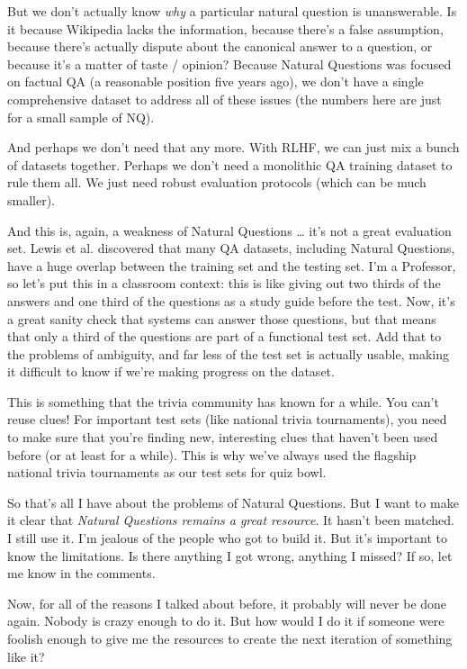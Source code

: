 But we don’t actually know \emph{why} a particular natural question is unanswerable.  Is it because Wikipedia lacks the information, because there’s a false assumption, because there’s actually dispute about the canonical answer to a question, or because it’s a matter of taste / opinion?  Because Natural Questions was focused on factual QA (a reasonable position five years ago), we don’t have a single comprehensive dataset to address all of these issues (the numbers here are just for a small sample of NQ).

And perhaps we don’t need that any more.  With RLHF, we can just mix a bunch of datasets together.  Perhaps we don’t need a monolithic QA training dataset to rule them all.  We just need robust evaluation protocols (which can be much smaller). 

And this is, again, a weakness of Natural Questions … it’s not a great evaluation set.  Lewis et al. discovered that many QA datasets, including Natural Questions, have a huge overlap between the training set and the testing set.  I’m a Professor, so let’s put this in a classroom context: this is like giving out two thirds of the answers and one third of the questions as a study guide before the test.  Now, it’s a great sanity check that systems can answer those questions, but that means that only a third of the questions are part of a functional test set.  Add that to the problems of ambiguity, and far less of the test set is actually usable, making it difficult to know if we’re making progress on the dataset.

This is something that the trivia community has known for a while.  You can’t reuse clues!  For important test sets (like national trivia tournaments), you need to make sure that you’re finding new, interesting clues that haven’t been used before (or at least for a while).  This is why we’ve always used the flagship national trivia tournaments as our test sets for quiz bowl.

So that’s all I have about the problems of Natural Questions.  But I want to make it clear that \emph{Natural Questions remains a great resource}.  It hasn’t been matched.  I still use it.  I’m jealous of the people who got to build it.  But it’s important to know the limitations.  Is there anything I got wrong, anything I missed?  If so, let me know in the comments.

Now, for all of the reasons I talked about before, it probably will never be done again.  Nobody is crazy enough to do it.  But how would I do it if someone were foolish enough to give me the resources to create the next iteration of something like it?

